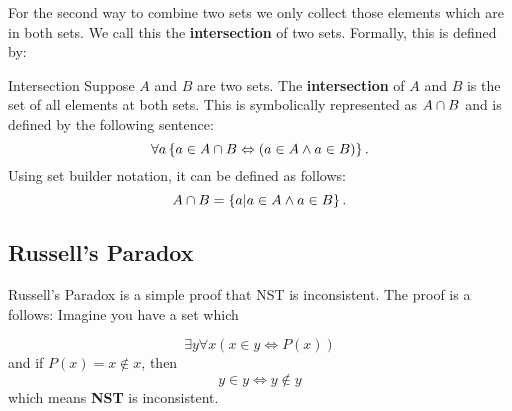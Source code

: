 For the second way to combine two sets we only collect those elements which are in both sets.
We call this the \textbf{intersection} of two sets.
Formally, this is defined by:
\begin{defn}{Intersection}
  Suppose $A$ and $B$ are two sets.
  The \textbf{intersection} of $A$ and $B$ is the set of all elements at both sets.
  This is symbolically represented as $A \cap B$ and is defined by the following sentence:
  $$
  \forall a \left\{ a \in A \cap B \Leftrightarrow (a \in A \wedge a \in B) \right\}.
  $$
  Using set builder notation, it can be defined as follows:
  $$
    A \cap B =  \left\{ a | a \in A \wedge a \in B \right\}.
  $$
\end{defn}


\subsection{Russell's Paradox}
Russell's Paradox is a simple proof that NST is inconsistent.
The proof is a follows: Imagine you have a set which 

$$
  \exists y \forall x (x \in y \iff P(x))
$$
and if $P(x) = x \notin x$, then
$$
  y \in y \iff y \notin y
$$
which means \textbf{NST} is inconsistent.
